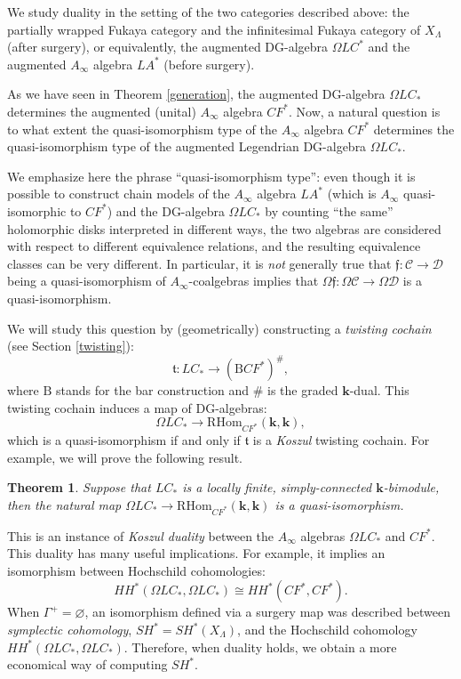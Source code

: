 \documentclass{gtpart}
\newtheorem{thm}{Theorem}
\renewcommand{\k}{\mathbf{k}}
\renewcommand{\t}{\mathfrak{t}}
\renewcommand{\Bar}{\mathrm{B}}
\renewcommand{\C}{\mathscr{C}}
\begin{document}
We study duality in the setting of the two categories described above: the partially wrapped Fukaya category and the infinitesimal Fukaya category of
$X_\Lambda$ (after surgery), or equivalently, the augmented DG-algebra $\Omega LC^*$ and the
augmented $A_\infty$ algebra $LA^*$ (before surgery). 

As we have seen in Theorem \ref{generation}, the augmented
DG-algebra $\Omega LC_*$ determines the augmented (unital) $A_\infty$ algebra
$CF^*$. Now, a natural question is to what extent the quasi-isomorphism type of the $A_\infty$ algebra
$CF^*$ determines the quasi-isomorphism type of the augmented Legendrian DG-algebra $\Omega LC_*$. 

We emphasize here the phrase ``quasi-isomorphism type'': even though it is possible
to construct chain models of the $A_\infty$ algebra  $LA^*$ (which is $A_\infty$ quasi-isomorphic to
$CF^*$) and the DG-algebra $\Omega LC_*$ by counting ``the same'' holomorphic disks interpreted in
different ways, the two algebras are considered with respect to different
equivalence relations, and the resulting equivalence classes can be very different. In particular, it is \emph{not} generally true that $\mathfrak{f}\colon \C \to \mathscr{D}$ being a
quasi-isomorphism of $A_\infty$-coalgebras implies that $\Omega
\mathfrak{f}\colon \Omega \C \to \Omega \mathscr{D}$ is a quasi-isomorphism. 

We will study this question by (geometrically) constructing a \emph{twisting cochain} (see
Section \ref{twisting}): 
\[ \t \colon LC_* \to (\Bar CF^*)^\#,  \] 
where $\Bar$ stands for the bar construction and $\#$ is the graded $\k$-dual.
This twisting cochain induces a map of DG-algebras:
\[ \Omega LC_* \to \mathrm{RHom}_{CF^*}( \k, \k), \]
which is a quasi-isomorphism if and only if $\t$ is a \emph{Koszul} twisting cochain. For
example, we will prove the following result. 

\begin{thm} Suppose that $LC_*$ is a locally finite, simply-connected $\k$-bimodule, then
    the natural map $\Omega LC_* \to \mathrm{RHom}_{CF^*}(\k, \k)$ is a quasi-isomorphism.
\end{thm}

This is an instance of \emph{Koszul duality} between the $A_\infty$ algebras $\Omega LC_*$ and
$CF^*$. This duality has many useful implications. For example, it implies an isomorphism between Hochschild cohomologies: 
\[
HH^*(\Omega LC_*, \Omega LC_*) \cong HH^*(CF^*, CF^*).
\]
When $\Gamma^+ = \varnothing$, an isomorphism defined via a surgery map \cite{BEE} was described between \emph{symplectic cohomology}, $SH^{\ast}=SH^*(X_{\Lambda})$, and the Hochschild cohomology $HH^*(\Omega LC_*, \Omega LC_*)$. Therefore, when duality holds, we obtain a more economical way of computing $SH^*$. 
\end{document}
